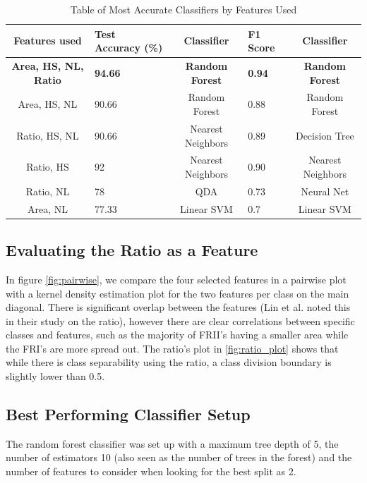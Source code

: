 \documentclass[conference]{IEEEtran}
\begin{document}
\begin{table}[h]
  \caption{Table of Most Accurate Classifiers by Features Used}
  \label{tab:freq}
\begin{center}
\begin{tabular}{|c|l|c|l|c|}
    \hline
        Features used & Test Accuracy (\%) & Classifier & F1 Score & Classifier \\
        \hline
        \textbf{Area, HS, NL, Ratio} & \textbf{94.66} & \textbf{Random Forest} & \textbf{0.94} & \textbf{Random Forest}\\
        \hline
        Area, HS, NL & 90.66 & Random Forest & 0.88 & Random Forest \\
        \hline
        Ratio, HS, NL & 90.66 & Nearest Neighbors & 0.89 & Decision Tree \\
        \hline
        Ratio, HS & 92 & Nearest Neighbors & 0.90 & Nearest Neighbors \\
        \hline
        Ratio, NL & 78 & QDA & 0.73 & Neural Net  \\
        \hline
        Area, NL & 77.33 & Linear SVM & 0.7 & Linear SVM \\
    \hline
\end{tabular}
\end{center}
\end{table}

\subsection{Evaluating the Ratio as a Feature}

In figure \ref{fig:pairwise}, we compare the four selected features in a pairwise plot with a kernel density estimation plot for the two features per class on the main diagonal. There is significant overlap between the features (Lin et al. \cite{lin_2010} noted this in their study on the ratio), however there are clear correlations between specific classes and features, such as the majority of FRII's having a smaller area while the FRI's are more spread out. The ratio's plot in \ref{fig:ratio_plot} shows that while there is class separability using the ratio, a class division boundary is slightly lower than 0.5. 

\subsection{Best Performing Classifier Setup}

The random forest classifier was set up with a maximum tree depth of 5, the number of estimators 10 (also seen as the number of trees in the forest) and the number of features to consider when looking for the best split as 2.
\end{document}
